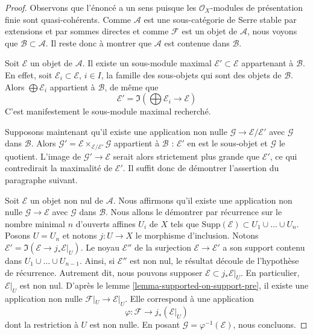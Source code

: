 \begin{proof}
Observons que l'énoncé a un sens puisque les $\mathcal{O}_X$-modules de
présentation finie sont quasi-cohérents.
Comme $\mathcal{A}$ est une sous-catégorie de Serre stable par extensions et
par sommes directes et comme $\mathcal{F}$ est un objet de $\mathcal{A}$,
nous voyons que $\mathcal{B} \subset \mathcal{A}$. Il reste donc à montrer
que $\mathcal{A}$ est contenue dans $\mathcal{B}$.

\medskip\noindent
Soit $\mathcal{E}$ un objet de $\mathcal{A}$. Il existe un sous-module
maximal $\mathcal{E}' \subset \mathcal{E}$ appartenant à $\mathcal{B}$.
En effet, soit $\mathcal{E}_i \subset \mathcal{E}$, $i \in I$, la famille
des sous-objets qui sont des objets de $\mathcal{B}$. Alors
$\bigoplus \mathcal{E}_i$ appartient à $\mathcal{B}$, de même que
$$
\mathcal{E}' = \Im(\bigoplus \mathcal{E}_i \longrightarrow \mathcal{E})
$$
C'est manifestement le sous-module maximal recherché.

\medskip\noindent
Supposons maintenant qu'il existe une application non nulle
$\mathcal{G} \to \mathcal{E}/\mathcal{E}'$
avec $\mathcal{G}$ dans $\mathcal{B}$. Alors
$\mathcal{G}' = \mathcal{E} \times_{\mathcal{E}/\mathcal{E}'} \mathcal{G}$
appartient à $\mathcal{B}$ : $\mathcal{E}'$ en est le sous-objet et
$\mathcal{G}$ le quotient. L'image de $\mathcal{G}' \to \mathcal{E}$ serait alors
strictement plus grande que $\mathcal{E}'$, ce qui contredirait la maximalité
de $\mathcal{E}'$. Il suffit donc de démontrer l'assertion du paragraphe
suivant.

\medskip\noindent
Soit $\mathcal{E}$ un objet non nul de $\mathcal{A}$. Nous affirmons qu'il
existe une application non nulle $\mathcal{G} \to \mathcal{E}$ avec
$\mathcal{G}$ dans $\mathcal{B}$. Nous allons le démontrer par récurrence sur
le nombre minimal $n$ d'ouverts affines $U_i$ de $X$ tels que
$\text{Supp}(\mathcal{E}) \subset U_1 \cup \ldots \cup U_n$.
Posons $U = U_n$ et notons $j : U \to X$ le morphisme d'inclusion.
Notons $\mathcal{E}' = \Im(\mathcal{E} \to j_*\mathcal{E}|_U)$.
Le noyau $\mathcal{E}''$ de la surjection
$\mathcal{E} \to \mathcal{E}'$ a son support contenu dans
$U_1 \cup \ldots \cup U_{n - 1}$. Ainsi, si $\mathcal{E}''$ est non nul,
le résultat découle de l'hypothèse de récurrence. Autrement dit, nous pouvons
supposer $\mathcal{E} \subset j_*\mathcal{E}|_U$.
En particulier, $\mathcal{E}|_U$ est non nul.
D'après le lemme \ref{lemma-supported-on-support-pre}, il existe une
application non nulle $\mathcal{F}|_U \to \mathcal{E}|_U$.
Elle correspond à une application
$$
\varphi : \mathcal{F} \longrightarrow j_*(\mathcal{E}|_U)
$$
dont la restriction à $U$ est non nulle.
En posant $\mathcal{G} = \varphi^{-1}(\mathcal{E})$, nous concluons.
\end{proof}

